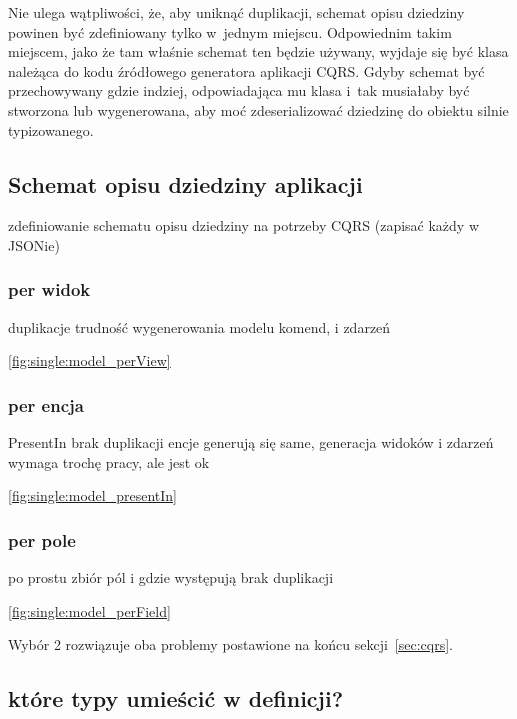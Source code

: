 Nie ulega wątpliwości, że, aby uniknąć duplikacji, schemat opisu dziedziny powinen być zdefiniowany tylko w~jednym miejscu.
Odpowiednim takim miejscem, jako że tam właśnie schemat ten będzie używany, wyjdaje się być klasa należąca do kodu źródłowego generatora aplikacji CQRS.
Gdyby schemat być przechowywany gdzie indziej, odpowiadająca mu klasa i~tak musiałaby być stworzona lub wygenerowana, aby moć zdeserializować dziedzinę do obiektu silnie typizowanego.

\subsection{Schemat opisu dziedziny aplikacji}

zdefiniowanie schematu opisu dziedziny na potrzeby CQRS (zapisać każdy w JSONie)

\subsubsection{per widok}

duplikacje
trudność wygenerowania modelu komend, i zdarzeń

\ref{fig:single:model_perView}


\subsubsection{per encja}

PresentIn
brak duplikacji
encje generują się same, generacja widoków i zdarzeń wymaga trochę pracy, ale jest ok

\ref{fig:single:model_presentIn}


\subsubsection{per pole}
po prostu zbiór pól i gdzie występują
brak duplikacji

\ref{fig:single:model_perField}


Wybór 2 rozwiązuje oba problemy postawione na końcu sekcji~\ref{sec:cqrs}.


\subsection{które typy umieścić w definicji?}

